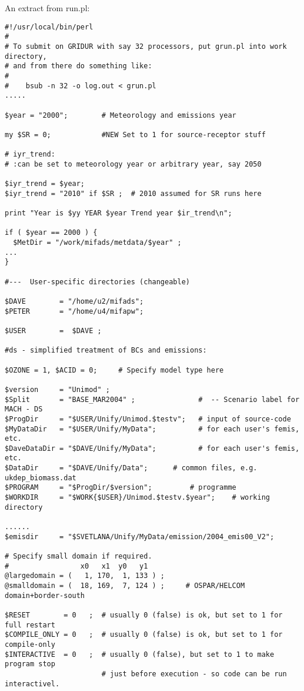 An extract from run.pl:
\begin{verbatim}
#!/usr/local/bin/perl
#
# To submit on GRIDUR with say 32 processors, put grun.pl into work directory, 
# and from there do something like:
#
#    bsub -n 32 -o log.out < grun.pl
.....

$year = "2000";        # Meteorology and emissions year

my $SR = 0;            #NEW Set to 1 for source-receptor stuff

# iyr_trend:
# :can be set to meteorology year or arbitrary year, say 2050

$iyr_trend = $year;  
$iyr_trend = "2010" if $SR ;  # 2010 assumed for SR runs here

print "Year is $yy YEAR $year Trend year $ir_trend\n";

if ( $year == 2000 ) {
  $MetDir = "/work/mifads/metdata/$year" ;
...
}

#---  User-specific directories (changeable)

$DAVE        = "/home/u2/mifads";      
$PETER       = "/home/u4/mifapw";      

$USER        =  $DAVE ;      

#ds - simplified treatment of BCs and emissions:

$OZONE = 1, $ACID = 0;     # Specify model type here

$version     = "Unimod" ;  
$Split       = "BASE_MAR2004" ;               #  -- Scenario label for MACH - DS
$ProgDir     = "$USER/Unify/Unimod.$testv";   # input of source-code
$MyDataDir   = "$USER/Unify/MyData";          # for each user's femis, etc.
$DaveDataDir = "$DAVE/Unify/MyData";          # for each user's femis, etc.
$DataDir     = "$DAVE/Unify/Data";      # common files, e.g. ukdep_biomass.dat
$PROGRAM     = "$ProgDir/$version";         # programme
$WORKDIR     = "$WORK{$USER}/Unimod.$testv.$year";    # working directory

......
$emisdir     = "$SVETLANA/Unify/MyData/emission/2004_emis00_V2";

# Specify small domain if required. 
#                 x0   x1  y0   y1
@largedomain = (   1, 170,  1, 133 ) ;
@smalldomain = (  18, 169,  7, 124 ) ;     # OSPAR/HELCOM domain+border-south

$RESET        = 0   ;  # usually 0 (false) is ok, but set to 1 for full restart
$COMPILE_ONLY = 0   ;  # usually 0 (false) is ok, but set to 1 for compile-only
$INTERACTIVE  = 0   ;  # usually 0 (false), but set to 1 to make program stop
                       # just before execution - so code can be run interactivel.


\end{verbatim}
